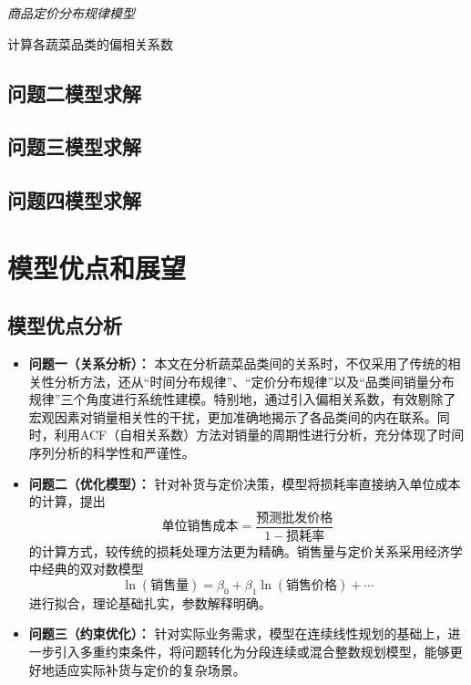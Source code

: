 \documentclass{article}
\begin{document}
\textit{商品定价分布规律模型}

计算各蔬菜品类的偏相关系数
\subsection{问题二模型求解}

\subsection{问题三模型求解}

\subsection{问题四模型求解}



\section{模型优点和展望}
\subsection{模型优点分析}
\begin{itemize}
    \item \textbf{问题一（关系分析）：} 本文在分析蔬菜品类间的关系时，不仅采用了传统的相关性分析方法，还从“时间分布规律”、“定价分布规律”以及“品类间销量分布规律”三个角度进行系统性建模。特别地，通过引入偏相关系数，有效剔除了宏观因素对销量相关性的干扰，更加准确地揭示了各品类间的内在联系。同时，利用ACF（自相关系数）方法对销量的周期性进行分析，充分体现了时间序列分析的科学性和严谨性。

    \item \textbf{问题二（优化模型）：} 针对补货与定价决策，模型将损耗率直接纳入单位成本的计算，提出
    \[
    \text{单位销售成本} = \frac{\text{预测批发价格}}{1 - \text{损耗率}}
    \]
    的计算方式，较传统的损耗处理方法更为精确。销售量与定价关系采用经济学中经典的双对数模型
    \[
    \ln(\text{销售量}) = \beta_0 + \beta_1 \ln(\text{销售价格}) + \cdots
    \]
    进行拟合，理论基础扎实，参数解释明确。

    \item \textbf{问题三（约束优化）：} 针对实际业务需求，模型在连续线性规划的基础上，进一步引入多重约束条件，将问题转化为分段连续或混合整数规划模型，能够更好地适应实际补货与定价的复杂场景。
\end{itemize}
\newpage
\end{document}
